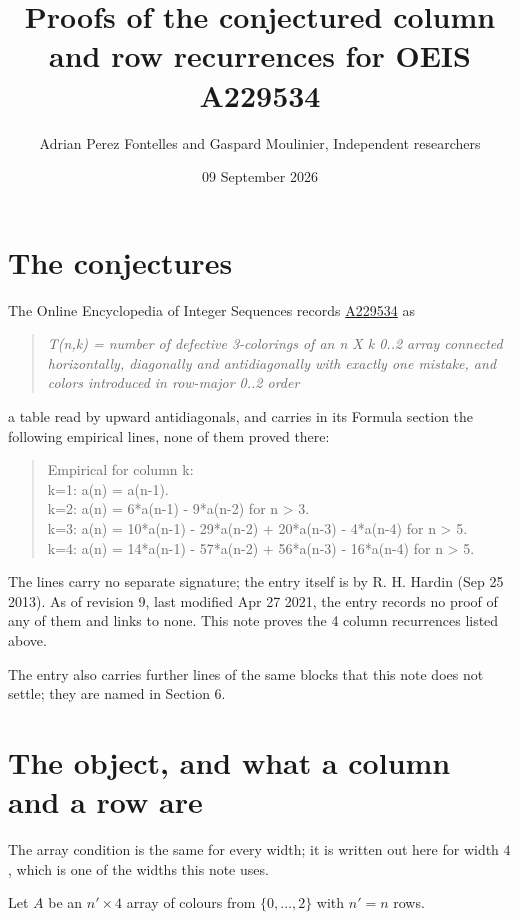 \documentclass[11pt]{article}
\title{Proofs of the conjectured column and row recurrences for OEIS A229534}
\author{Adrian Perez Fontelles and Gaspard Moulinier, Independent researchers}
\date{09 September 2026}
\theoremstyle{definition}
\begin{document}
\maketitle
\section{The conjectures}

The Online Encyclopedia of Integer Sequences records \href{https://oeis.org/A229534}{A229534} as

\begin{quote}\itshape T(n,k) = number of defective 3-colorings of an n X k 0..2 array connected horizontally, diagonally and antidiagonally with exactly one mistake, and colors introduced in row-major 0..2 order\end{quote}

a table read by upward antidiagonals, and carries in its Formula section the following empirical lines, none of them proved there:

\begin{quote}\ttfamily Empirical for column k:\\
k=1: a(n) = a(n-1).\\k=2: a(n) = 6*a(n-1) - 9*a(n-2) for n > 3.\\k=3: a(n) = 10*a(n-1) - 29*a(n-2) + 20*a(n-3) - 4*a(n-4) for n > 5.\\k=4: a(n) = 14*a(n-1) - 57*a(n-2) + 56*a(n-3) - 16*a(n-4) for n > 5.\end{quote}

The lines carry no separate signature; the entry itself is by R. H. Hardin (Sep 25 2013). As of revision 9, last modified Apr 27 2021, the entry records no proof of any of them and links to none. This note proves the 4 column recurrences listed above.

The entry also carries further lines of the same blocks that this note does not settle; they are named in Section 6.

\section{The object, and what a column and a row are}

The array condition is the same for every width; it is written out here for width $4$, which is one of the widths this note uses.

Let $A$ be an $n' \times 4$ array of colours from $\{0,\dots,2\}$ with $n' = n$ rows.
\end{document}

